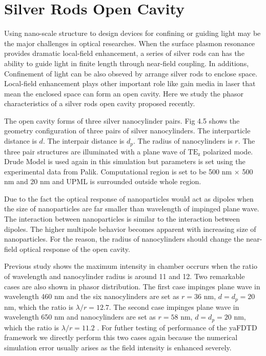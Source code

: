 \section{Silver Rods Open Cavity}
Using nano-scale structure to design devices for confining or guiding light may be the major challenges in optical
researches. When the surface plasmon resonance provides dramatic local-field enhancement, a series of silver rods can
has the ability to guide light in finite length through near-field coupling. In additions, Confinement of light can be
also obseved by arrange silver rods to enclose space. Local-field enhancement plays other important role like gain media
in laser that mean the enclosed space can form an open cavity. Here we study the phasor characteristics of a silver rods
open cavity proposed recently.

The open cavity forms of three silver nanocylinder pairs. Fig 4.5 shows the geometry configuration of three pairs of
silver nanocylinders. The interparticle distance is $d$. The interpair distance is $d_p$. The radius of nanocylinders is
$r$. The three pair structures are illuminated with a plane wave of $\mathrm{TE_z}$ polarized mode. Drude Model is used
again in this simulation but parameters is set using the experimental data from Palik. Computational region is set to be
500 nm $\times$ 500 nm and 20 nm and UPML is surrounded outside whole region.

Due to the fact the optical response of nanoparticles would act as dipoles when the size of nanoparticles are far
smaller than wavelength of impinged plane wave. The interaction between nanoparticles is similar to the interaction
between dipoles. The higher multipole behavior becomes apparent with increasing size of nanoparticles. For the reason,
the radius of nanocylinders should change the near-field optical response of the open cavity.

Previous study shows the maximum intensity in chamber occrurs when the ratio of wavelength and nanocylinder radius is
around 11 and 12. Two remarkable cases are also shown in phasor distribution. The first case impinges plane wave in
wavelength 460 nm and the six nanocylinders are set as $r = 36$ nm, $d = d_p = 20$ nm, which the ratio is $\lambda /r
= 12.7$. The second case impinges plane wave in wavelength 650 nm and nanocylinders are set as $r = 58$ nm, $d = d_p =
20$ nm, which the ratio is $\lambda /r = 11.2$ . For futher testing of performance of the yaFDTD framework we directly
perform this two cases again because the numerical simulation error usually arises as the field intensity is enhanced
severely.

